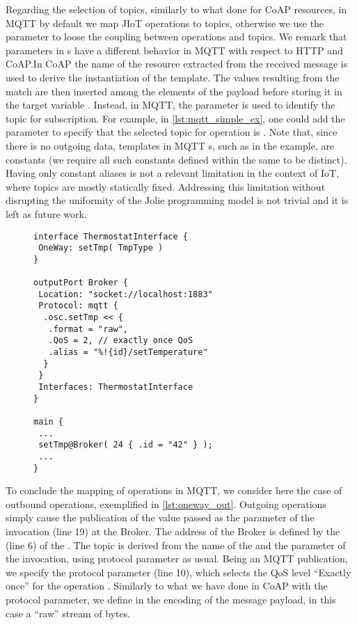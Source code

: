 Regarding the selection of topics, similarly to what done for CoAP resources, in
MQTT by default we map JIoT operations to topics, otherwise we use the
 parameter  to loose the coupling between operations and
topics. We remark that  parameters in s have a
different behavior in MQTT with respect to HTTP and CoAP.\@ In CoAP the name of
the resource extracted from the received message is used to derive the
instantiation of the  template. The values resulting from the match
are then inserted among the elements of the payload before storing it in the
target variable . Instead, in MQTT, the  parameter is
used to identify the topic for subscription. For example, in
\cref{lst:mqtt_simple_ex}, one could add the  parameter
 to specify that the
selected topic for operation  is .
Note that, since there is no outgoing data, templates in MQTT s,
such as  in the example, are constants (we require all such
constants defined within the same  to be distinct). Having only
constant aliases is not a relevant limitation in the context of IoT, where
topics are mostly statically fixed. Addressing this limitation without
disrupting the uniformity of the Jolie programming model is not trivial and it
is left as future work.


\begin{figure}[t]
 \begin{lstlisting}[basicstyle=\footnotesize\ttfamily,caption={Example of
outgoing MQTT \code{OneWay} communication.},label=lst:oneway_out]
interface ThermostatInterface {
 OneWay: setTmp( TmpType )
}

outputPort Broker {
 Location: "socket://localhost:1883"
 Protocol: mqtt {
  .osc.setTmp << {
   .format = "raw",
   .QoS = 2, // exactly once QoS
   .alias = "%!{id}/setTemperature"
  }
 }
 Interfaces: ThermostatInterface
}

main {
 ...
 setTmp@Broker( 24 { .id = "42" } );
 ...
}
\end{lstlisting}
\end{figure}

To conclude the mapping of  operations in MQTT, we consider here
the case of outbound operations, exemplified in \cref{lst:oneway_out}.
%
Outgoing  operations simply cause the publication of the value
passed as the parameter of the invocation (line 19) at the Broker. The address
of the Broker is defined by the  (line 6) of the
 . The topic is derived from the name of the
 and the parameter of the invocation, using protocol parameter
 as usual. Being an MQTT publication, we specify the 
protocol parameter (line 10), which selects the QoS level ``Exactly once'' for
the operation . Similarly to what we have done in CoAP with the
 protocol parameter, we define in  the
encoding of the message payload, in this case a ``raw'' stream of bytes.


